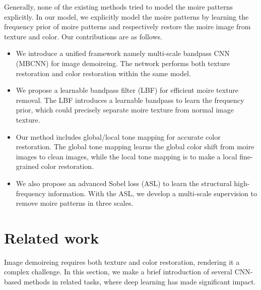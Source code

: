 \documentclass[10pt,twocolumn,letterpaper]{article}
\begin{document}
Generally, none of the existing methods tried to model the moire patterns explicitly. 
In our model, we explicitly model the moire patterns by learning the frequency prior of moire patterns and respectively restore the moire image from texture and color.
Our contributions are as follows. 
\begin{itemize}
\item We introduce a unified framework namely multi-scale bandpass CNN (MBCNN) for image demoireing. The network performs both texture restoration and color restoration within the same model.
\item We propose a learnable bandpass filter (LBF) for efficient moire texture removal. The LBF introduces a learnable bandpass to learn the frequency prior, which could precisely separate moire texture from normal image texture. 
\item Our method includes global/local tone mapping for accurate color restoration. The global tone mapping learns the global color shift from moire images to clean images, while the local tone mapping is to make a local fine-grained color restoration.
\item We also propose an advanced Sobel loss (ASL) to learn the structural high-frequency information. With the ASL, we develop a multi-scale supervision to remove moire patterns in three scales.
\end{itemize}
\begin{comment}
\begin{itemize}
    \item Learnable bandpass filter, to expand
    \item global/local tone mapping, to expand
    \item sobel loss, expand
\end{itemize}
\end{comment}



\section{Related work}

Image demoireing requires both texture and color restoration, rendering it a complex challenge.
In this section, we make a brief introduction of several CNN-based methods in related tasks, where deep learning has made significant impact.
\end{document}
